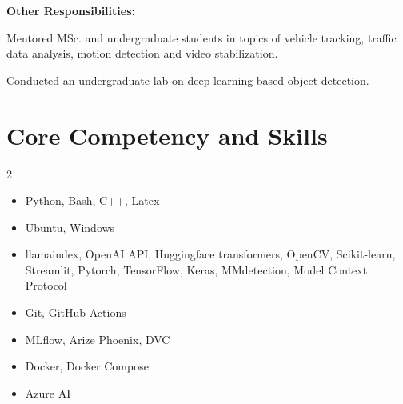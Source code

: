 \documentclass[a4paper,11pt]{article}
\newcommand{\customsubsection}[1]{
	\hspace{20pt}\textbf{#1}\\[-2pt]
	\vspace{4pt}
}
\newcommand{\heading}[2]{
	\hspace{10pt}#1\hfill#2\\
}
\newcommand{\headingBf}[2]{
	\heading{\textbf{#1}}{\textbf{#2}}
}
\newcommand{\headingIt}[2]{
	\heading{\textit{#1}}{\textit{#2}}
}
\newenvironment{resume_list}{
	\vspace{-7pt}
	\begin{itemize}[itemsep=-2px, parsep=1pt, leftmargin=30pt]
	}{
	\end{itemize}
}
\newcommand{\itemTitle}[1]{
	\item[] \hspace{-10pt}\textit{#1}\vspace{4pt}
}
\begin{document}
	\customsubsection{Other Responsibilities:}
	\begin{resume_list}
		\item Mentored MSc. and undergraduate students in topics of vehicle tracking, traffic data analysis, motion detection and video stabilization.
		\item Conducted an undergraduate lab on deep learning-based object detection.
	\end{resume_list}


	
	\section{Core Competency and Skills}
	
	\begin{multicols}{2}
		\begin{itemize}[itemsep=-2px, parsep=1pt, leftmargin=75pt]
			\item[\textbf{Languages}] Python, Bash, C++, Latex
			\item[\textbf{OS}] Ubuntu, Windows
			\item[\textbf{Libraries}] llamaindex, OpenAI API, Huggingface transformers, OpenCV, Scikit-learn, Streamlit, Pytorch, TensorFlow, Keras, MMdetection, Model Context Protocol
			\item[\textbf{CI/CD}] Git, GitHub Actions
			\item[\textbf{MLOps}] MLflow, Arize Phoenix, DVC
			\item[\textbf{Deployment}] Docker, Docker Compose
			\item[\textbf{Cloud}] Azure AI
		\end{itemize}
	\end{multicols}
	
	
\end{document}
